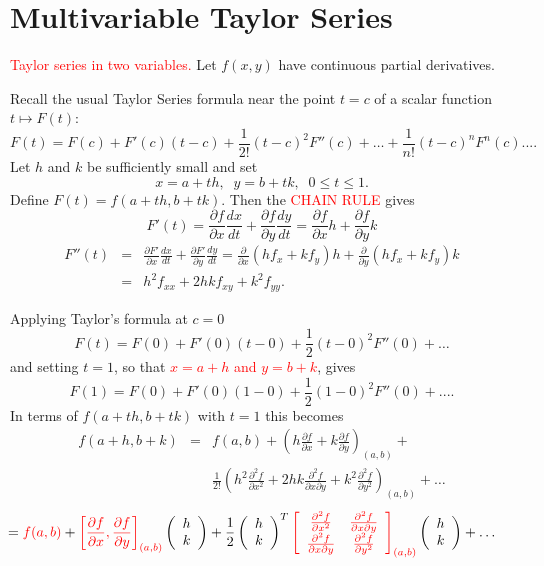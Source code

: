 \documentclass{article}
\begin{document}
\section{Multivariable Taylor Series}

\textcolor{red}{Taylor series in two variables.} Let $f(x,y)$ have
continuous partial derivatives. 

Recall the usual Taylor Series formula near the point $t=c$ of a scalar function $t \mapsto F(t)$:
$$
F(t)=F(c)+F'(c)(t-c)+\frac{1}{2!} (t-c)^2 F''(c)+ \ldots + \frac{1}{n!} (t-c)^n F^n(c)....
$$
Let $h$ and $k$ be sufficiently small and set
$$
x=a+t h, \;\; y=b+tk, \;\;  0 \le t \le 1.
$$
Define $F(t)=f(a+th, b+tk)$. Then the \textcolor{red}{CHAIN RULE} gives
$$
F'(t)=\frac{\partial f}{\partial x} \frac{d x}{d t} + \frac{\partial f}{\partial y} \frac{d y}{d t}=\frac{\partial f}{\partial x} h + \frac{\partial f}{\partial y} k
$$
$$
\begin{array}{lll}
F''(t) & = & \frac{\partial F'}{\partial x} \frac{d x}{d t} + \frac{\partial F'}{\partial y} \frac{d y}{d t} = \frac{\partial}{\partial x} \left( hf_x+kf_y \right) h + \frac{\partial}{\partial y}\left( hf_x+kf_y \right) k\\
& = & h^2 f_{xx}+ 2hk
f_{xy}+k^2f_{yy}.
\end{array}
$$


Applying Taylor's formula at $c=0$
{\small
$$
F(t)=F(0)+F'(0)(t-0)+\frac{1}{2} (t-0)^2 F''(0)+ \ldots
$$
}
and setting $t=1$, so that \textcolor{red}{$x = a + h$ and $y = b + k$}, gives
{\small
$$
F(1)=F(0)+F'(0)(1-0)+\frac{1}{2} (1-0)^2 F''(0)+....
$$
}
In terms of $f(a + th, b+tk)$ with $t=1$ this becomes
{\small
$$
\begin{array}{lll}
f(a+h,b+k) & = & f(a,b)+\left( h \frac{\partial f}{\partial x} + k
\frac{\partial f}{\partial y}  \right)_{(a,b)} + \\
& & \frac{1}{2!} \left( h^2 \frac{\partial^2
f}{\partial x^2} + 2hk \frac{\partial^2 f}{\partial x \partial y}
+ k^2 \frac{\partial^2 f}{\partial y^2}\right)_{(a,b)} + \ldots
\end{array}
$$
}
{\small
$$
\hspace{-.5cm}
= \textcolor{red}{f(a,b)} + \textcolor{red}{\left[ \frac{\partial f}{\partial x}, 
\frac{\partial f}{\partial y} \right]_{(a,b)}} \left( \begin{array}{c} h\\k \end{array} \right) + \frac{1}{2} \left( \begin{array}{c} h\\k \end{array} \right)^T \textcolor{red}{\left[ \begin{array}{cc}
\frac{\partial ^2 f}{\partial x ^2} & \frac{\partial ^2 f}{\partial x \partial y}\\\frac{\partial ^2 f}{\partial x \partial y} & \frac{\partial ^2 f}{\partial y ^2} \end{array} \right]_{(a,b)} }\left( \begin{array}{c} h\\k \end{array} \right) + \ldots 
$$
}
\end{document}
